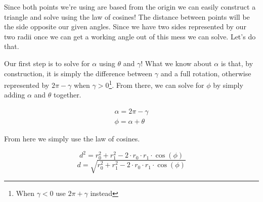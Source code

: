 \begin{solution}
    Since both points we're using are based from the origin we can easily construct a triangle and solve using the law of cosines! The distance between points will be the side opposite our given angles. Since we have two sides represented by our two radii once we can get a working angle out of this mess we can solve. Let's do that. \medskip
    
    Our first step is to solve for $\alpha$ using $\theta$ and $\gamma$! What we know about $\alpha$ is that, by construction, it is simply the difference between $\gamma$ and a full rotation, otherwise represented by $2\pi - \gamma$ when $\gamma > 0$\footnote{When $\gamma < 0$ use $2\pi + \gamma$ instead}. From there, we can solve for $\phi$ by simply adding $\alpha$ and $\theta$ together.
    
    \begin{align}
        \alpha = 2\pi - \gamma \\
        \phi = \alpha + \theta 
    \end{align}
    
    From here we simply use the law of cosines.
    
    \[d^2 = r_0^2 + r_1^2 - 2 \cdot r_0 \cdot r_1 \cdot \cos(\phi)\]
    \[\boxed{d = \sqrt{r_0^2 + r_1^2 - 2 \cdot r_0 \cdot r_1 \cdot \cos(\phi)}}\]
\end{solution}